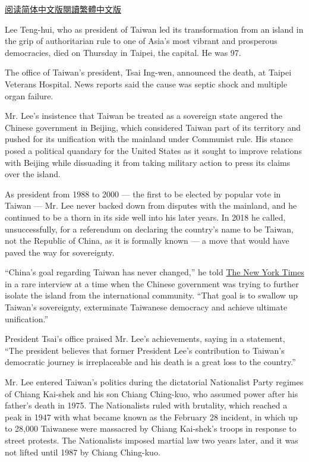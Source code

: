 \href{https://cn.nytimes.com/asia-pacific/20200730/lee-teng-hui-dead/}{阅读简体中文版}\href{https://cn.nytimes.com/asia-pacific/20200730/lee-teng-hui-dead/zh-hant/}{閱讀繁體中文版}

Lee Teng-hui, who as president of Taiwan led its transformation from an
island in the grip of authoritarian rule to one of Asia's most vibrant
and prosperous democracies, died on Thursday in Taipei, the capital. He
was 97.

The office of Taiwan's president, Tsai Ing-wen, announced the death, at
Taipei Veterans Hospital. News reports said the cause was septic shock
and multiple organ failure.

Mr. Lee's insistence that Taiwan be treated as a sovereign state angered
the Chinese government in Beijing, which considered Taiwan part of its
territory and pushed for its unification with the mainland under
Communist rule. His stance posed a political quandary for the United
States as it sought to improve relations with Beijing while dissuading
it from taking military action to press its claims over the island.

As president from 1988 to 2000 --- the first to be elected by popular
vote in Taiwan --- Mr. Lee never backed down from disputes with the
mainland, and he continued to be a thorn in its side well into his later
years. In 2018 he called, unsuccessfully, for a referendum on declaring
the country's name to be Taiwan, not the Republic of China, as it is
formally known --- a move that would have paved the way for sovereignty.

``China's goal regarding Taiwan has never changed,'' he told
\href{https://www.nytimes.com/2018/05/25/world/asia/china-taiwan-identity-xi-jinping.html}{The
New York Times} in a rare interview at a time when the Chinese
government was trying to further isolate the island from the
international community. ``That goal is to swallow up Taiwan's
sovereignty, exterminate Taiwanese democracy and achieve ultimate
unification.''

President Tsai's office praised Mr. Lee's achievements, saying in a
statement, ``The president believes that former President Lee's
contribution to Taiwan's democratic journey is irreplaceable and his
death is a great loss to the country.''

Mr. Lee entered Taiwan's politics during the dictatorial Nationalist
Party regimes of Chiang Kai-shek and his son Chiang Ching-kuo, who
assumed power after his father's death in 1975. The Nationalists ruled
with brutality, which reached a peak in 1947 with what became known as
the February 28 incident, in which up to 28,000 Taiwanese were massacred
by Chiang Kai-shek's troops in response to street protests. The
Nationalists imposed martial law two years later, and it was not lifted
until 1987 by Chiang Ching-kuo.

